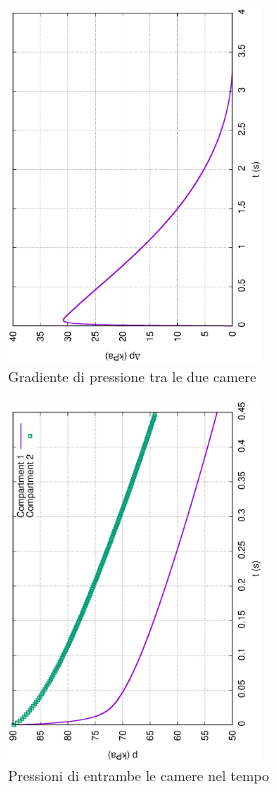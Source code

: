 \documentclass{article}
\begin{document}
        \begin{figure}[h!]
            \centering
            \label{fig:grad_cam_0}
            \includegraphics[width=0.6\textwidth, angle=-90]{MUL2/Esercitazione1/1A/Dp.eps}
            \caption{Gradiente di pressione tra le due camere}
        \end{figure}
        \clearpage
        
        \begin{figure}[h!]
            \centering
            \label{fig:press_cam_0.5}
            \includegraphics[width=0.6\textwidth, angle=-90]{MUL2/Esercitazione1/1B/p.eps}
            \caption{Pressioni di entrambe le camere nel tempo}
        \end{figure}
\end{document}
